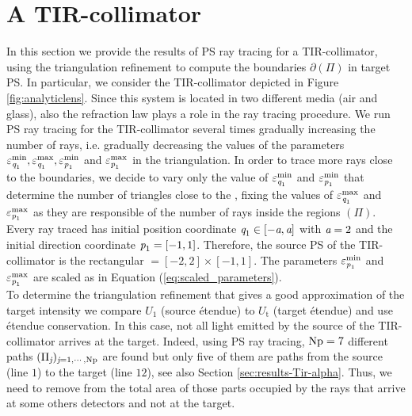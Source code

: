 \section{A TIR-collimator}
In this section we provide the results of PS ray tracing for a TIR-collimator, using the triangulation refinement to compute the boundaries $\partial$$(\Pi)$ in target PS. In particular, we consider the TIR-collimator depicted in Figure \ref{fig:analyticlens}. Since this system is located in two different media (air and glass), also the refraction law plays a role in the ray tracing procedure. We run PS ray tracing for the TIR-collimator several times gradually increasing the number of rays, i.e. gradually decreasing the values of the parameters $\varepsilon_{\textit{q}_1}^{\textrm{min}}, \varepsilon_{\textit{q}_1}^{\textrm{max}}, \varepsilon_{\textit{p}_1}^{\textrm{min}}$ and $\varepsilon_{\textit{p}_1}^{\textrm{max}}$ in the triangulation. In order to trace more rays close to the boundaries, we decide to vary only the value of $\varepsilon_{\textit{q}_1}^{\textrm{min}}$ and $ \varepsilon_{\textit{p}_1}^{\textrm{min}}$ that determine the number of triangles close to the , fixing the values of $ \varepsilon_{\textit{q}_1}^{\textrm{max}}$ and $ \varepsilon_{\textit{p}_1}^{\textrm{max}}$ as they are responsible of the number of rays inside the regions $(\Pi)$. Every ray traced has initial position coordinate $\textit{q}_1\in[-\textit{a}, \textit{a}]$ with $\textit{a}=2$ and the initial direction coordinate $\textit{p}_1=[-1,1]$. Therefore, the source PS of the TIR-collimator is the rectangular $= [-2, 2] \times [-1, 1]$. The parameters $\varepsilon_{\textit{p}_1}^{\textrm{min}}$ and $\varepsilon_{\textit{p}_1}^{\textrm{max}}$ are scaled as in Equation (\ref{eq:scaled_parameters}).
\\ \indent To determine the triangulation refinement that gives a good approximation of the target intensity we compare $U_1$ (source \'{e}tendue) to $U_{\textrm{t}}$ (target \'{e}tendue) and use \'{e}tendue conservation. In this case, not all light emitted by the source of the TIR-collimator arrives at the target. Indeed, using PS ray tracing, $\textrm{Np}=7$ different paths $(\Pi_{\textit{j}})_{\textit{j}=1, \cdots, \textrm{Np}}$ are found but only five of them are paths from the source (line $1$) to the target (line $12$), see also Section \ref{sec:results-Tir-alpha}. Thus, we need to remove from the total area of  those parts occupied by the rays that arrive at some others detectors and not at the target. %
